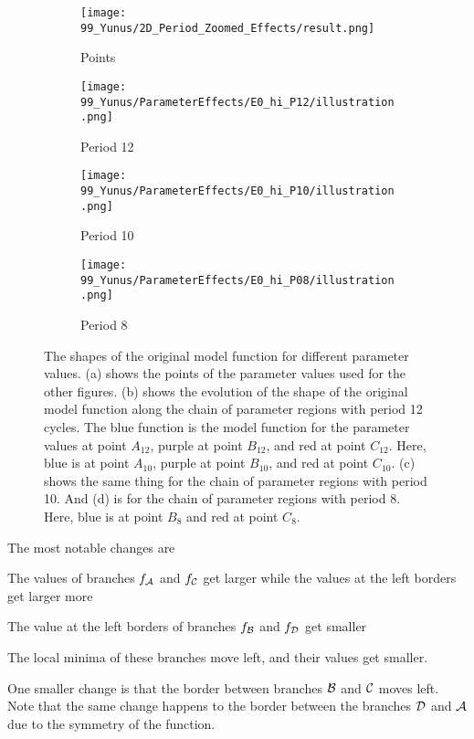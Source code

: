 \begin{figure}
	\centering
	\begin{subfigure}{0.4\textwidth}
		\texttt{[image: 99\_Yunus/2D\_Period\_Zoomed\_Effects/result.png]}
		\caption{Points}
		\label{fig:setup.char.evolution.map}
	\end{subfigure}
	\begin{subfigure}{0.4\textwidth}
		\texttt{[image: 99\_Yunus/ParameterEffects/E0\_hi\_P12/illustration.png]}
		\caption{Period 12}
		\label{fig:setup.char.evolution.12}
	\end{subfigure}
	\begin{subfigure}{0.4\textwidth}
		\texttt{[image: 99\_Yunus/ParameterEffects/E0\_hi\_P10/illustration.png]}
		\caption{Period 10}
		\label{fig:setup.char.evolution.10}
	\end{subfigure}
	\begin{subfigure}{0.4\textwidth}
		\texttt{[image: 99\_Yunus/ParameterEffects/E0\_hi\_P08/illustration.png]}
		\caption{Period 8}
		\label{fig:setup.char.evolution.08}
	\end{subfigure}
	\caption[Effects of parameters on the original model function]{
		The shapes of the original model function for different parameter values.
		(a) shows the points of the parameter values used for the other figures.
		(b) shows the evolution of the shape of the original model function along the chain of parameter regions with period 12 cycles.
		The blue function is the model function for the parameter values at point $A_{12}$, purple at point $B_{12}$, and red at point $C_{12}$.
		Here, blue is at point $A_{10}$, purple at point $B_{10}$, and red at point $C_{10}$.
		(c) shows the same thing for the chain of parameter regions with period 10.
		And (d) is for the chain of parameter regions with period 8.
		Here, blue is at point $B_8$ and red at point $C_8$.
	}
	\label{fig:setup.char.evolution.combined}
\end{figure}

The most notable changes are
\begin{enumerate*}
	\item The values of branches $f_{\mathcal{A}}$ and $f_{\mathcal{C}}$ get larger while the values at the left borders get larger more
	\item The value at the left borders of branches $f_{\mathcal{B}}$ and $f_{\mathcal{D}}$ get smaller
	\item The local minima of these branches move left, and their values get smaller.
\end{enumerate*}
One smaller change is that the border between branches $\mathcal{B}$ and $\mathcal{C}$ moves left.
Note that the same change happens to the border between the branches $\mathcal{D}$ and $\mathcal{A}$ due to the symmetry of the function.


